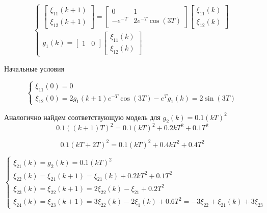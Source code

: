 \begin{equation}
	\begin{cases}
	\begin{bmatrix}
		\xi_{11}(k+1)\\
		\xi_{12}(k+1)
	\end{bmatrix}=
	\begin{bmatrix}
		0 & 1\\
		-e^{-T} & 2e^{-T}\cos(3T)
	\end{bmatrix}
		\begin{bmatrix}
		\xi_{11}(k)\\
		\xi_{12}(k)
	\end{bmatrix}\\
	g_1(k) =
		\begin{bmatrix}
		1 & 0
	\end{bmatrix}
		\begin{bmatrix}
		\xi_{11}(k)\\
		\xi_{12}(k)
	\end{bmatrix}
	\end{cases}
\end{equation}

Начальные условия

\begin{equation}
	\begin{cases}
		\xi_{11}(0) = 0\\
		\xi_{12}(0) = 2g_1(k+1)e^{-T}\cos (3T)-e^Tg_1(k) = 2 \sin (3T)
	\end{cases}
\end{equation}

Аналогично найдем соответствующую модель для $g_2(k)=0.1(kT)^2$
\begin{equation}
	 0.1((k+1)T)^2 = 0.1(kT)^2 + 0.2kT^2+0.1T^2
\end{equation}

\begin{equation}
	0.1(kT + 2T)^2 = 0.1(kT)^2 + 0.4kT^2+0.4T^2
\end{equation}

\begin{equation}
	\begin{cases}
		\xi_{21}(k) = g_2(k)=0.1(kT)^2\\
		\xi_{22}(k) =\xi_{21}(k+1) = \xi_{21}(k) + 0.2kT^2+0.1T^2\\
		\xi_{23}(k) = \xi_{22}(k+1) = 2\xi_{22}(k) - \xi_{21}+0.2T^2\\
		\xi_{24}(k) = \xi_{23}(k+1) = 3\xi_{22}(k) -2\xi_1(k) + 0.6T^2 = 
		-3\xi_{22}+\xi_{21}(k) + 3 \xi_{23}
	\end{cases}
\end{equation}


